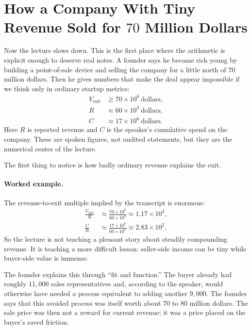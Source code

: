 \section{How a Company With Tiny Revenue Sold for \(70\) Million Dollars}

Now the lecture slows down. This is the first place where the arithmetic is explicit enough to deserve real notes. A founder says he became rich young by building a point-of-sale device and selling the company for a little north of \(70\) million dollars. Then he gives numbers that make the deal appear impossible if we think only in ordinary startup metrics:
\begin{align}
V_{\text{exit}} &\gtrsim 70 \times 10^6 \ \text{dollars},\\
R &\approx 60 \times 10^3 \ \text{dollars},\\
C &\approx 17 \times 10^6 \ \text{dollars}.
\end{align}
Here \(R\) is reported revenue and \(C\) is the speaker's cumulative spend on the company. These are spoken figures, not audited statements, but they are the numerical center of the lecture.

The first thing to notice is how badly ordinary revenue explains the exit.

\paragraph{Worked example.} The revenue-to-exit multiple implied by the transcript is enormous:
\begin{align}
\frac{V_{\text{exit}}}{R}
&\approx
\frac{70 \times 10^6}{60 \times 10^3}
\approx 1.17 \times 10^3,\\
\frac{C}{R}
&\approx
\frac{17 \times 10^6}{60 \times 10^3}
\approx 2.83 \times 10^2.
\end{align}
So the lecture is not teaching a pleasant story about steadily compounding revenue. It is teaching a more difficult lesson: seller-side income can be tiny while buyer-side value is immense.

The founder explains this through ``fit and function.'' The buyer already had roughly \(11{,}000\) sales representatives and, according to the speaker, would otherwise have needed a process equivalent to adding another \(9{,}000\). The founder says that this avoided process was itself worth about \(70\) to \(80\) million dollars. The sale price was then not a reward for current revenue; it was a price placed on the buyer's saved friction.

